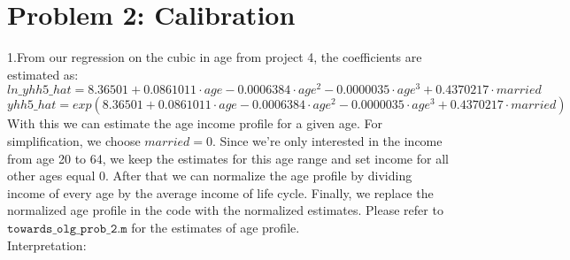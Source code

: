 \documentclass[12pt,a4paper]{article}
\begin{document}
\section*{Problem 2: Calibration}
1.From our regression on the cubic in age from project 4, the coefficients are estimated as:
\begin{equation*}
    ln\_yhh5\_hat=8.36501+0.0861011\cdot age-0.0006384 \cdot age^2-0.0000035\cdot age^3+0.4370217\cdot married   
\end{equation*}
\begin{equation*}
    yhh5\_hat=exp(8.36501+0.0861011\cdot age-0.0006384 \cdot age^2-0.0000035\cdot age^3+0.4370217\cdot married)  
\end{equation*}
With this we can estimate the age income profile for a given age. For simplification, we choose $married=0$. Since we're only interested in the income from age 20 to 64, we keep the estimates for this age range and set income for all other ages equal 0. After that we can normalize the age profile by dividing income of every age by the average income of life cycle. Finally, we replace the normalized age profile in the code with the normalized estimates. Please refer to $\texttt{towards\_olg\_prob\_2.m}$ for the estimates of age profile. \\
Interpretation:

\\
\end{document}
